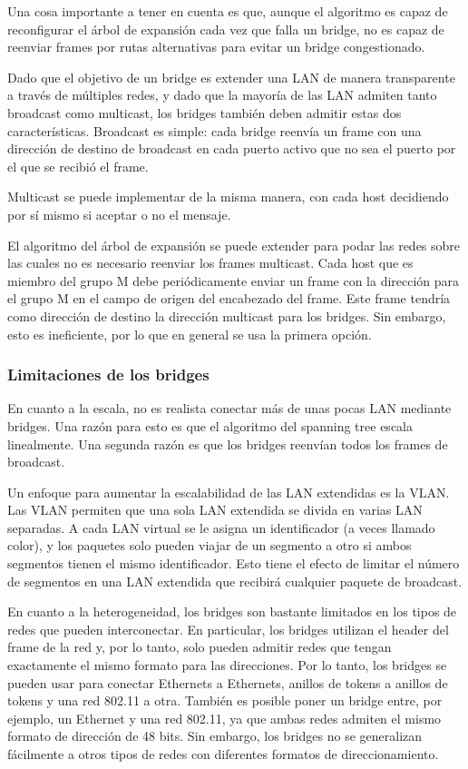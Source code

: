 Una cosa importante a tener en cuenta es que, aunque el algoritmo es capaz de reconfigurar el árbol de expansión cada vez que falla un bridge, no es capaz de reenviar frames por rutas alternativas para evitar un bridge congestionado.

Dado que el objetivo de un bridge es extender una LAN de manera transparente a través de múltiples redes, y dado que la mayoría de las LAN admiten tanto broadcast como multicast, los bridges también deben admitir estas dos características. Broadcast es simple: cada bridge reenvía un frame con una dirección de destino de broadcast en cada puerto activo que no sea el puerto por el que se recibió el frame.

Multicast se puede implementar de la misma manera, con cada host decidiendo por sí mismo si aceptar o no el mensaje.


El algoritmo del árbol de expansión se puede extender para podar las redes sobre las cuales no es necesario reenviar los frames multicast. Cada host que es miembro del grupo M debe periódicamente enviar un frame con la dirección para el grupo M en el campo de origen del encabezado del frame. Este frame tendría como dirección de destino la dirección multicast para los bridges. Sin embargo, esto es ineficiente, por lo que en general se usa la primera opción.

\subsubsection{Limitaciones de los bridges}
En cuanto a la escala, no es realista conectar más de unas pocas LAN mediante bridges. Una razón para esto es que el algoritmo del spanning tree escala linealmente. Una segunda razón es que los bridges reenvían todos los frames de broadcast.

Un enfoque para aumentar la escalabilidad de las LAN extendidas es la VLAN. Las VLAN permiten que una sola LAN extendida se divida en varias LAN separadas. A cada LAN virtual se le asigna un identificador (a veces llamado color), y los paquetes solo pueden viajar de un segmento a otro si ambos segmentos tienen el mismo identificador. Esto tiene el efecto de limitar el número de segmentos en una LAN extendida que recibirá cualquier paquete de broadcast.

En cuanto a la heterogeneidad, los bridges son bastante limitados en los tipos de redes que pueden interconectar. En particular, los bridges utilizan el header del frame de la red y, por lo tanto, solo pueden admitir redes que tengan exactamente el mismo formato para las direcciones. Por lo tanto, los bridges se pueden usar para conectar Ethernets a Ethernets, anillos de tokens a anillos de tokens y una red 802.11 a otra. También es posible poner un bridge entre, por ejemplo, un Ethernet y una red 802.11, ya que ambas redes admiten el mismo formato de dirección de 48 bits. Sin embargo, los bridges no se generalizan fácilmente a otros tipos de redes con diferentes formatos de direccionamiento.
